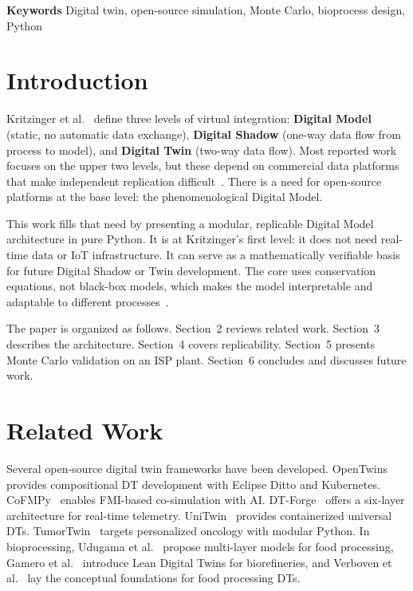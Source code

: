\documentclass[10pt]{article}
\begin{document}
{\fontsize{12}{14}\bfseries\selectfont Keywords}\newline
{\fontsize{10}{12}\selectfont
Digital twin, open-source simulation, Monte Carlo, bioprocess design, Python}

\section{Introduction}

Kritzinger et al.~\cite{kritzinger2018digital} define three levels of virtual integration: \textbf{Digital Model} (static, no automatic data exchange), \textbf{Digital Shadow} (one-way data flow from process to model), and \textbf{Digital Twin} (two-way data flow). Most reported work focuses on the upper two levels, but these depend on commercial data platforms that make independent replication difficult~\cite{gil2024survey}. There is a need for open-source platforms at the base level: the phenomenological Digital Model.

This work fills that need by presenting a modular, replicable Digital Model architecture in pure Python. It is at Kritzinger's first level: it does not need real-time data or IoT infrastructure. It can serve as a mathematically verifiable basis for future Digital Shadow or Twin development. The core uses conservation equations, not black-box models, which makes the model interpretable and adaptable to different processes~\cite{perry2019}.

The paper is organized as follows. Section~2 reviews related work. Section~3 describes the architecture. Section~4 covers replicability. Section~5 presents Monte Carlo validation on an ISP plant. Section~6 concludes and discusses future work.

\section{Related Work}

Several open-source digital twin frameworks have been developed. OpenTwins~\cite{robles2023opentwins} provides compositional DT development with Eclipse Ditto and Kubernetes. CoFMPy~\cite{friedrich2025cofmupy} enables FMI-based co-simulation with AI. DT-Forge~\cite{dtforge2025} offers a six-layer architecture for real-time telemetry. UniTwin~\cite{haussermann2024unitwin} provides containerized universal DTs. TumorTwin~\cite{tumortwin2025} targets personalized oncology with modular Python. In bioprocessing, Udugama et al.~\cite{udugama2023digital} propose multi-layer models for food processing, Gamero et al.~\cite{gamero2024data} introduce Lean Digital Twins for biorefineries, and Verboven et al.~\cite{verboven2020digital} lay the conceptual foundations for food processing DTs.
\end{document}
